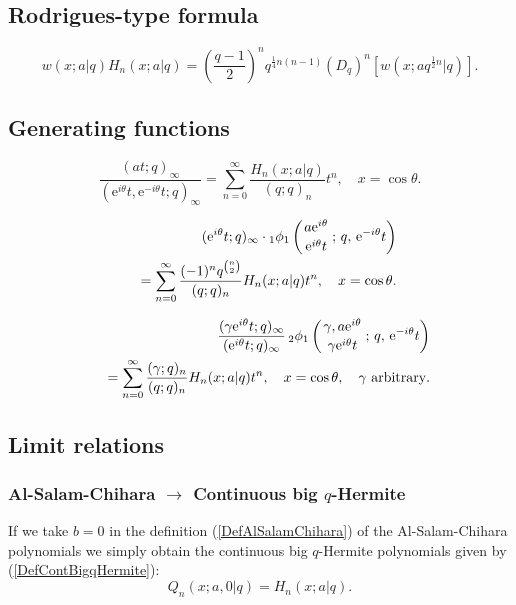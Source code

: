 \documentclass[envcountchap,graybox]{svmono}
\newcommand{\qhyp}[5]{\mbox{}_{#1}{\phi}_{#2}
\left(\genfrac{}{}{0pt}{}{#3}{#4}\,;\,q,\,#5\right)}
\newcommand{\e}{\textrm{e}}
\newcommand{\qhyp}[5]{\,\mbox{}_{#1}\phi_{#2}\!\left(
  \genfrac{}{}{0pt}{}{#3}{#4};#5\right)}
\begin{document}
{{\subsection*{Rodrigues-type formula}
\begin{equation}
\label{RodContBigqHermite}
w(x;a|q)H_n(x;a|q)=\left(\frac{q-1}{2}\right)^nq^{\frac{1}{4}n(n-1)}
\left(D_q\right)^n\left[w(x;aq^{\frac{1}{2}n}|q)\right].
\end{equation}

\subsection*{Generating functions}
\begin{equation}
\label{GenContBigqHermite1}
\frac{(at;q)_{\infty}}{(\e^{i\theta}t,\e^{-i\theta}t;q)_{\infty}}
=\sum_{n=0}^{\infty}\frac{H_n(x;a|q)}{(q;q)_n}t^n,\quad x=\cos\theta.
\end{equation}

\begin{eqnarray}
\label{GenContBigqHermite2}
& &(\e^{i\theta}t;q)_{\infty}\cdot\qhyp{1}{1}{a\e^{i\theta}}{\e^{i\theta}t}{\e^{-i\theta}t}\nonumber\\
& &{}=\sum_{n=0}^{\infty}\frac{(-1)^nq^{\binom{n}{2}}}{(q;q)_n}H_n(x;a|q)t^n,
\quad x=\cos\theta.
\end{eqnarray}

\begin{eqnarray}
\label{GenContBigqHermite3}
& &\frac{(\gamma\e^{i\theta}t;q)_{\infty}}{(\e^{i\theta}t;q)_{\infty}}\,
\qhyp{2}{1}{\gamma,a\e^{i\theta}}{\gamma\e^{i\theta}t}{\e^{-i\theta}t}\nonumber\\
& &{}=\sum_{n=0}^{\infty}\frac{(\gamma;q)_n}{(q;q)_n}H_n(x;a|q)t^n,
\quad x=\cos\theta,\quad\textrm{$\gamma$ arbitrary}.
\end{eqnarray}

\subsection*{Limit relations}

\subsubsection*{Al-Salam-Chihara $\rightarrow$ Continuous big $q$-Hermite}
If we take $b=0$ in the definition (\ref{DefAlSalamChihara}) of the Al-Salam-Chihara
polynomials we simply obtain the continuous big $q$-Hermite polynomials given by
(\ref{DefContBigqHermite}):
$$Q_n(x;a,0|q)=H_n(x;a|q).$$

}}
\end{document}
